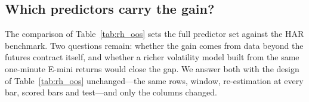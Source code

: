 
\subsection{Which predictors carry the gain?}
\label{sec:rh_results_ablation}

The comparison of Table~\ref{tab:rh_oos} sets the full predictor set against the HAR benchmark.  Two questions remain:
whether the gain comes from data beyond the futures contract itself, and whether a richer volatility model built from
the same one-minute E-mini returns would close the gap.  We answer both with the design of Table~\ref{tab:rh_oos}
unchanged---the same rows, window, re-estimation at every bar, scored bars and test---and only the columns changed.

